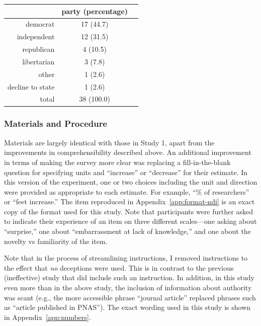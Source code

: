 \begin{table}[ht]
\centering
\begin{tabular}{rcc}
  \toprule
      & party (percentage) \\ 
  \midrule
  democrat &  17 (44.7) \\ 
  independent &  12 (31.5) \\ 
  republican &   4 (10.5) \\ 
  libertarian &   3 (7.8) \\ 
  other &   1 (2.6) \\ 
  decline to state &   1 (2.6) \\ 
  \midrule
  total &  38 (100.0) \\ 
   \bottomrule
\end{tabular}
\end{table}


\subsubsection{Materials and Procedure}

Materials are largely identical with those in Study 1, apart from the
improvements in comprehensibility described above. An additional improvement in
terms of making the survey more clear was replacing a fill-in-the-blank question
for specifying units and “increase” or “decrease” for their estimate. In this
version of the experiment, one or two choices including the unit and direction
were provided as appropriate to each estimate. For example, “\% of researchers”
or “feet increase.” The item reproduced in Appendix~\ref{app:format-ndi} is an
exact copy of the format used for this study.  Note that participants were
further asked to indicate their experience of an item on three different
scales---one asking about “surprise,” one about “embarrassment at lack of
knowledge,” and one about the novelty vs familiarity of the item.

Note that in the process of streamlining instructions, I removed instructions to
the effect that \emph{no} deceptions were used. This is in contrast to the previous
(ineffective) study that did include such an instruction.  In addition, in this
study even more than in the above study, the inclusion of information about
authority was scant (e.g., the more accessible phrase “journal article” replaced
phrases such as “article published in PNAS”). The exact wording used in this
study is shown in Appendix~\ref{app:numbers}.

